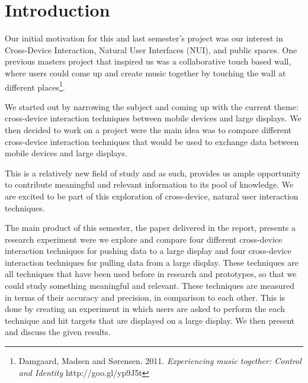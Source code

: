 \section*{Introduction}\label{sec:introduction}
Our initial motivation for this and last semester's project was our interest in Cross-Device Interaction, Natural User Interfaces (NUI), and public spaces.
One previous masters project that inspired us was a collaborative touch based wall, where users could come up and create music together by touching the wall at different places\footnote{Damgaard, Madsen and Sørensen. 2011. \textit{Experiencing music together: Control and Identity} http://goo.gl/yp9J5t}.

We started out by narrowing the subject and coming up with the current theme: cross-device interaction techniques between mobile devices and large displays. 
We then decided to work on a project were the main idea was to compare different cross-device interaction techniques that would be used to exchange data between mobile devices and large displays. 

This is a relatively new field of study and as such, provides us ample opportunity to contribute meaningful and relevant information to its pool of knowledge. 
We are excited to be part of this exploration of cross-device, natural user interaction techniques. 

The main product of this semester, the paper delivered in the report, presents a research experiment were we explore and compare four different cross-device interaction techniques for pushing data to a large display and four cross-device interaction techniques for pulling data from a large display. 
These techniques are all techniques that have been used before in research and prototypes, so that we could study something meaningful and relevant.
These techniques are measured in terms of their accuracy and precision, in comparison to each other.
This is done by creating an experiment in which users are asked to perform the each technique and hit targets that are displayed on a large display.
We then present and discuss the given results. 